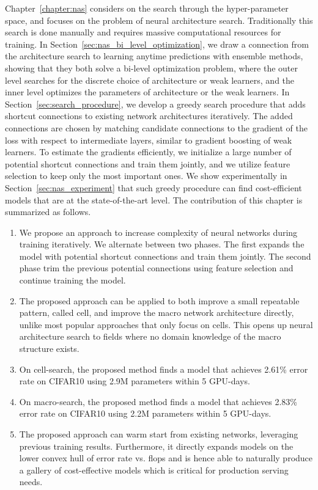 Chapter~\ref{chapter:nas} considers on the search through the hyper-parameter space, and focuses on the problem of neural architecture search. 
Traditionally this search is done manually and requires massive computational resources for training. In Section~\ref{sec:nas_bi_level_optimization}, we draw a connection from the architecture search to learning anytime predictions with ensemble methods, showing that they both solve a bi-level optimization problem, where the outer level searches for the discrete choice of architecture or weak learners, and the inner level optimizes the parameters of architecture or the weak learners. In Section~\ref{sec:search_procedure}, we develop a greedy search procedure that adds shortcut connections to existing network architectures iteratively. The added connections are chosen by matching candidate connections to the gradient of the loss with respect to intermediate layers, similar to gradient boosting of weak learners. To estimate the gradients efficiently, we initialize a large number of potential shortcut connections and train them jointly, and we utilize feature selection to keep only the most important ones. We show experimentally in Section~\ref{sec:nas_experiment} that such greedy procedure can find cost-efficient models that are at the state-of-the-art level. 
The contribution of this chapter is summarized as follows.

\begin{enumerate}[resume]
\item We propose an approach to increase complexity of neural networks during training iteratively. We alternate between two phases. The first expands the model with potential shortcut connections and train them jointly. The second phase trim the previous potential connections using feature selection and continue training the model. 
\item The proposed approach can be applied to both improve a small repeatable pattern, called cell, and improve the macro network architecture directly, unlike most popular approaches that only focus on cells. This opens up neural architecture search to fields where no domain knowledge of the macro structure exists. 
\item On cell-search, the proposed method finds a model that achieves 2.61\% error rate on CIFAR10 using 2.9M parameters within 5 GPU-days. 
\item On macro-search, the proposed method finds a model that achieves 2.83\% error rate on CIFAR10 using 2.2M parameters within 5 GPU-days. 
\item The proposed approach can warm start from existing networks, leveraging previous training results. Furthermore, it directly expands models on the lower convex hull of error rate vs. flops and is hence able to naturally produce a gallery of cost-effective models which is critical for production serving needs. 
\end{enumerate}



